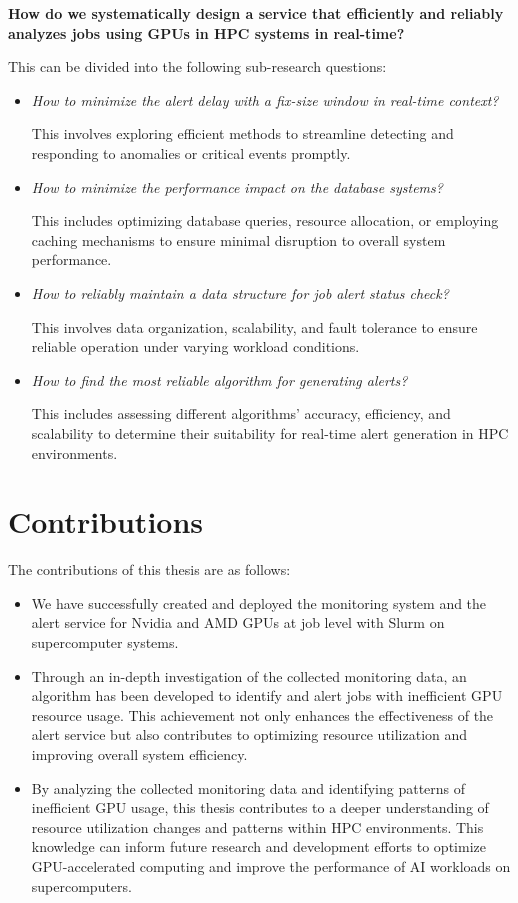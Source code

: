 \textbf{
How do we systematically design a service that efficiently and reliably analyzes jobs using GPUs in HPC systems in real-time?
}

This can be divided into the following sub-research questions:

\begin{itemize}
    \item \textit{How to minimize the alert delay with a fix-size window in real-time context?}

This involves exploring efficient methods to streamline detecting and responding to anomalies or critical events promptly.

    \item \textit{How to minimize the performance impact on the database systems?}

This includes optimizing database queries, resource allocation, or employing caching mechanisms to ensure minimal disruption to overall system performance.

    \item \textit{How to reliably maintain a data structure for job alert status check?}

This involves data organization, scalability, and fault tolerance to ensure reliable operation under varying workload conditions.
    
    \item \textit{How to find the most reliable algorithm for generating alerts?}

This includes assessing different algorithms' accuracy, efficiency, and scalability to determine their suitability for real-time alert generation in HPC environments.

\end{itemize}


\section{Contributions}

The contributions of this thesis are as follows:

\begin{itemize}
    \item We have successfully created and deployed the monitoring system and the alert service for Nvidia and AMD GPUs at job level with Slurm on supercomputer systems.
    \item Through an in-depth investigation of the collected monitoring data, an algorithm has been developed to identify and alert jobs with inefficient GPU resource usage. This achievement not only enhances the effectiveness of the alert service but also contributes to optimizing resource utilization and improving overall system efficiency.
    \item By analyzing the collected monitoring data and identifying patterns of inefficient GPU usage, this thesis contributes to a deeper understanding of resource utilization changes and patterns within HPC environments. This knowledge can inform future research and development efforts to optimize GPU-accelerated computing and improve the performance of AI workloads on supercomputers.
\end{itemize}

